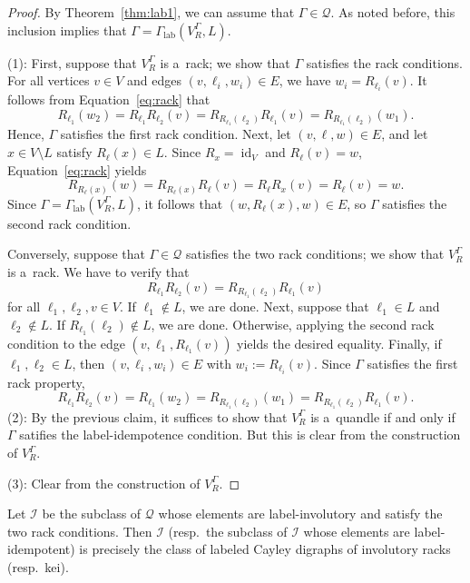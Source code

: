 \documentclass{jonasart}
\DeclareMathOperator{\id}{id}
\DeclareMathOperator{\lab}{lab}
\begin{document}
	\begin{proof}
		By Theorem~\ref{thm:lab1}, we can assume that $\Gamma\in\mathcal{Q}$. As noted before, this inclusion implies that $\Gamma=\Gamma_{\lab}(V^\Gamma_R,L)$.

		(1): First, suppose that $V^\Gamma_R$ is a~rack; we show that $\Gamma$ satisfies the rack conditions. For all vertices $v\in V$ and edges ${(v,\ell_i,w_i )\in E}$, we have $w_i =R_{\ell_i}(v)$. It follows from Equation~\eqref{eq:rack} that
		\[
			R_{\ell_1}(w_2)=R_{\ell_1}R_{\ell_2}(v)=R_{R_{\ell_1}(\ell_2)}R_{\ell_1}(v)=R_{R_{\ell_1}(\ell_2)}(w_1).
		\]
		Hence, $\Gamma$ satisfies the first rack condition. Next, let $(v,\ell,w)\in E$, and let $x\in V\setminus L$ satisfy $R_\ell(x)\in L$. Since $R_x =\id_V$ and $R_\ell(v)=w$, Equation~\eqref{eq:rack} yields
		\[
			R_{R_\ell(x)}(w)
            = R_{R_\ell(x)}R_\ell(v)
            = R_\ell R_x(v)
            = R_\ell(v)
            = w.
		\]
		Since $\Gamma=\Gamma_{\lab}(V^\Gamma_R,L)$, it follows that $(w,R_{\ell}(x),w)\in E$, so $\Gamma$ satisfies the second rack condition.

		Conversely, suppose that $\Gamma\in \mathcal{Q}$ satisfies the two rack conditions; we show that $V^\Gamma_R$ is a~rack. We have to verify that
		\begin{equation*}
			R_{\ell_1}R_{\ell_2}(v)=R_{R_{\ell_1}(\ell_2 )}R_{\ell_1}(v)
		\end{equation*}
		for all $\ell_1,\ell_2,v\in V$. If $\ell_1\notin L$, we are done. Next, suppose that $\ell_1\in L$ and $\ell_2\notin L$. If $R_{\ell_1}(\ell_2 )\notin L$, we are done. Otherwise, applying the second rack condition to the edge $(v,\ell_1,R_{\ell_1}(v))$ yields the desired equality. Finally, if $\ell_1,\ell_2\in L$, then $(v,\ell_i,w_i )\in E$ with $w_i:=R_{\ell_i}(v)$. Since $\Gamma$ satisfies the first rack property,
		\[
			R_{\ell_1}R_{\ell_2}(v)=R_{\ell_1}(w_2)=R_{R_{\ell_1}(\ell_2)}(w_1)=R_{R_{\ell_1}(\ell_2)}R_{\ell_1}(v).
		\]
		(2): By the previous claim, it suffices to show that $V^\Gamma_R$ is a~quandle if and only if $\Gamma$ satifies the label-idempotence condition. But this is clear from the construction of $V^\Gamma_R$.

		(3): Clear from the construction of $V^\Gamma_R$.
	\end{proof}

	\begin{corollary}\label{cor:kei}
		Let $\mathcal{I}$ be the subclass of $\mathcal{Q}$ whose elements are label-involutory and satisfy the two rack conditions. Then $\mathcal{I}$ (resp.\ the subclass of $\mathcal{I}$ whose elements are label-idempotent) is precisely the class of labeled Cayley digraphs of involutory racks (resp.\ kei).
	\end{corollary}
    
\end{document}
